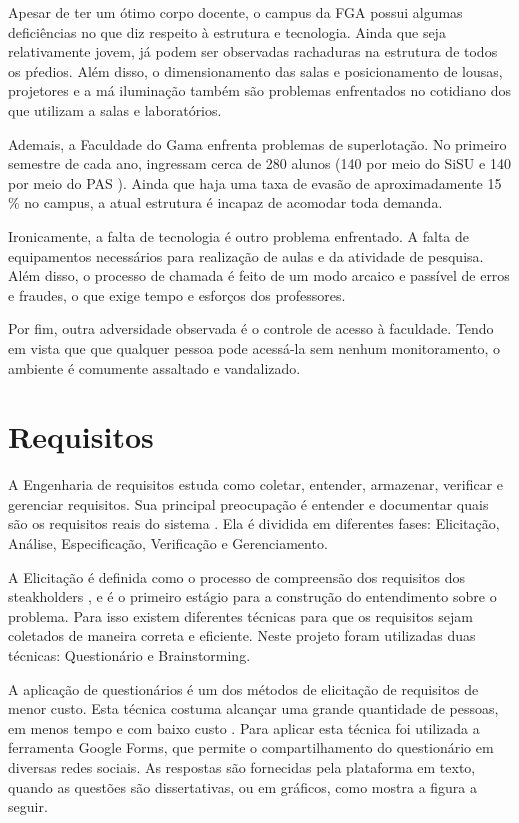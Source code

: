 Apesar de ter um ótimo corpo docente, o campus da FGA possui algumas deficiências no que diz respeito à estrutura e tecnologia. Ainda que seja relativamente jovem, já podem ser observadas rachaduras na estrutura de todos os pŕedios. Além disso, o dimensionamento das salas e posicionamento de lousas, projetores e a má iluminação também são problemas enfrentados no cotidiano dos que utilizam a salas e laboratórios.

Ademais, a Faculdade do Gama enfrenta problemas de superlotação. No primeiro semestre de cada ano, ingressam cerca de 280 alunos (140 por meio do SiSU \cite{sisu} e 140 por meio do PAS \cite{pas}). Ainda que haja uma taxa de evasão de aproximadamente 15 \% \cite{evasao} no campus, a atual estrutura é incapaz de acomodar toda demanda.

Ironicamente, a falta de tecnologia é outro problema enfrentado. A falta de equipamentos necessários para realização de aulas e da atividade de pesquisa. Além disso, o processo de chamada é feito de um modo arcaico e passível de erros e fraudes, o que exige tempo e esforços dos professores.

Por fim, outra adversidade observada é o controle de acesso à faculdade. Tendo em vista que que qualquer pessoa pode acessá-la sem nenhum monitoramento, o ambiente é comumente assaltado e vandalizado.

\chapter{Requisitos\label{ch:requisitos}}

A Engenharia de requisitos estuda como coletar, entender, armazenar, verificar e gerenciar requisitos. Sua principal preocupação é entender e documentar quais são os requisitos reais do sistema \cite{belgamo2000}. Ela é dividida em diferentes fases: Elicitação, Análise, Especificação, Verificação e Gerenciamento.

A Elicitação é definida como o processo de  compreensão dos requisitos dos steakholders \cite{yousuf2015}, e é o primeiro estágio para a construção do entendimento sobre o problema. Para isso existem diferentes técnicas para que os requisitos sejam coletados de maneira correta e eficiente. Neste projeto foram utilizadas duas técnicas:
Questionário e Brainstorming.

A aplicação de questionários é um dos métodos de elicitação de requisitos de menor custo. Esta técnica costuma alcançar uma grande quantidade de pessoas, em menos  tempo e com baixo custo \cite{gunda2008}. Para aplicar esta técnica foi utilizada a ferramenta Google Forms, que permite o compartilhamento do questionário em diversas redes sociais. As respostas são fornecidas pela plataforma em texto, quando as questões são dissertativas, ou em gráficos, como mostra a figura a seguir.


